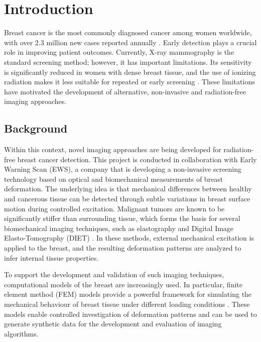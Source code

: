 \section{Introduction}

Breast cancer is the most commonly diagnosed cancer among women worldwide, with over 2.3 million new cases reported annually \cite{WHO2025}. Early detection plays a crucial role in improving patient outcomes. Currently, X-ray mammography is the standard screening method; however, it has important limitations. Its sensitivity is significantly reduced in women with dense breast tissue, and the use of ionizing radiation makes it less suitable for repeated or early screening \cite{VonEuler-Chelpin2019, Bakker2019}. These limitations have motivated the development of alternative, non-invasive and radiation-free imaging approaches.

\subsection{Background}

Within this context, novel imaging approaches are being developed for radiation-free breast cancer detection. This project is conducted in collaboration with Early Warning Scan (EWS), a company that is developing a non-invasive screening technology based on optical and biomechanical measurements of breast deformation. The underlying idea is that mechanical differences between healthy and cancerous tissue can be detected through subtle variations in breast surface motion during controlled excitation. Malignant tumors are known to be significantly stiffer than surrounding tissue, which forms the basis for several biomechanical imaging techniques, such as elastography and Digital Image Elasto-Tomography (DIET) \cite{Samani2007, Patel2022, Peters2004}. In these methods, external mechanical excitation is applied to the breast, and the resulting deformation patterns are analyzed to infer internal tissue properties.

To support the development and validation of such imaging techniques, computational models of the breast are increasingly used. In particular, finite element method (FEM) models provide a powerful framework for simulating the mechanical behaviour of breast tissue under different loading conditions \cite{Samani2001, Hsu2011}. These models enable controlled investigation of deformation patterns and can be used to generate synthetic data for the development and evaluation of imaging algorithms.

